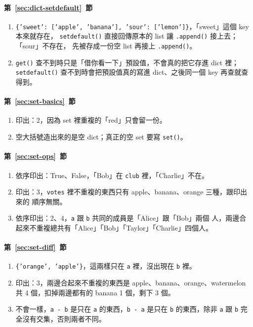 \paragraph{第~\ref{sec:dict-setdefault}~節}
\begin{enumerate}
\item \texttt{\{'sweet': ['apple', 'banana'], 'sour': ['lemon']\}}，「sweet」這個 key 本來就存在，
\texttt{setdefault()} 直接回傳原本的 list 讓 \texttt{.append()} 接上去；「sour」不存在，
先被存成一份空 list 再接上 \texttt{.append()}。
\item \texttt{get()} 查不到時只是「借你看一下」預設值，不會真的把它存進 dict 裡；
\texttt{setdefault()} 查不到時會把預設值真的寫進 dict、之後同一個 key 再查就查得到。
\end{enumerate}

\paragraph{第~\ref{sec:set-basics}~節}
\begin{enumerate}
\item 印出：2，因為 set 裡重複的「red」只會留一份。
\item 空大括號造出來的是空 dict；真正的空 set 要寫 \texttt{set()}。
\end{enumerate}

\paragraph{第~\ref{sec:set-ops}~節}
\begin{enumerate}
\item 依序印出：True、False，「Bob」在 \texttt{club} 裡，「Charlie」不在。
\item 印出：3，\texttt{votes} 裡不重複的東西只有 apple、banana、orange 三種，跟印出來的
順序無關。
\item 依序印出：2、4，\texttt{a} 跟 \texttt{b} 共同的成員是「Alice」跟「Bob」兩個
人，兩邊合起來不重複總共有「Alice」「Bob」「Taylor」「Charlie」四個人。
\end{enumerate}

\paragraph{第~\ref{sec:set-diff}~節}
\begin{enumerate}
\item \texttt{\{'orange', 'apple'\}}，這兩樣只在 \texttt{a} 裡，沒出現在 \texttt{b} 裡。
\item 印出：3，兩邊合起來不重複的東西是 apple、banana、orange、watermelon 共 4 個，扣掉兩邊都有的
banana 1 個，剩下 3 個。
\item 不會一樣，\texttt{a - b} 是只在 \texttt{a} 的東西，\texttt{b - a} 是只在
\texttt{b} 的東西，除非 \texttt{a} 跟 \texttt{b} 完全沒有交集，否則兩者不同。
\end{enumerate}

